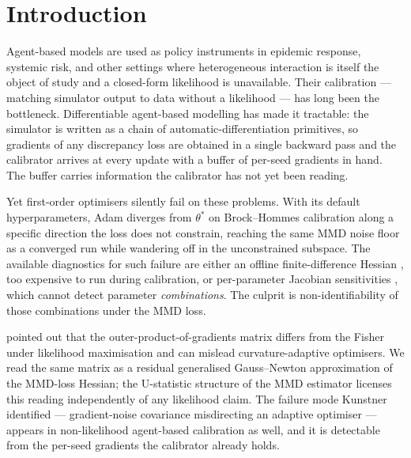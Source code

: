\section{Introduction}
\label{sec:intro}

Agent-based models are used as policy instruments in epidemic
response, systemic risk, and other settings where heterogeneous
interaction is itself the object of study and a closed-form likelihood
is unavailable. Their calibration --- matching simulator output to
data without a likelihood --- has long been the bottleneck.
Differentiable agent-based modelling
\citep{querabofarull_diffabm_2023,querabofarull_diffabm_2025} has made
it tractable: the simulator is written as a chain of
automatic-differentiation primitives, so gradients of any discrepancy
loss are obtained in a single backward pass and the calibrator arrives
at every update with a buffer of per-seed gradients in hand. The
buffer carries information the calibrator has not yet been reading.

Yet first-order optimisers silently fail on these problems. With its
default hyperparameters, Adam diverges from $\theta^*$ on
Brock--Hommes calibration along a specific direction the loss does not
constrain, reaching the same MMD noise floor as a converged run while
wandering off in the unconstrained subspace. The available diagnostics
for such failure are either an offline finite-difference Hessian
\citep{naumann_woleske_2024}, too expensive to run during calibration,
or per-parameter Jacobian sensitivities
\citep{querabofarull_diffabm_2025}, which cannot detect parameter
\emph{combinations}. The culprit is non-identifiability of those
combinations under the MMD loss.

\citet{kunstner_opg_2019} pointed out that the outer-product-of-gradients
matrix differs from the Fisher under likelihood maximisation and can
mislead curvature-adaptive optimisers. We read the same matrix as a
residual generalised Gauss--Newton approximation of the MMD-loss
Hessian; the U-statistic structure of the MMD estimator licenses this
reading independently of any likelihood claim. The failure mode
Kunstner identified --- gradient-noise covariance misdirecting an
adaptive optimiser --- appears in non-likelihood agent-based
calibration as well, and it is detectable from the per-seed gradients
the calibrator already holds.

